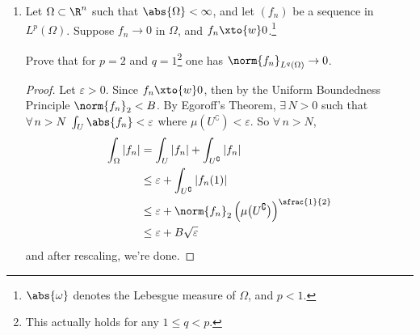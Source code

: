\documentclass[12pt,letterpaper]{article}
\renewcommand{\phi}{\varphi}
\renewcommand{\epsilon}{\varepsilon}
\begin{document}
\begin{enumerate}
\begin{example*}
\begin{remark*}
Wait, why doesn't it work that $\angles{\phi_n,u_j}\xto{j}\angles{\phi_n,u}\xto{n}\angles{\phi,u}$; using weak convergence followed by weak* convergence?

It does. However $\angles{\phi_k,u_k}\xto{k}\angles{\phi,u}$ requires that we can get $\angles{\phi_k,u_k}$ arbitrarily close to $\angles{\phi,u}$ without taking \textit{either one }of the limits.
\end{remark*}
\end{example*}
\begin{proof} \textsc{Case I:}
Suppose $\norm{x_n}\to\norm{x}$. Then there exists $N>0$ such that $n>N \implies \norm{x_n-x}<\epsilon$ for all $\epsilon>0$. Since $\phi_j\xto{w*}\phi$, then by the Uniform Boundedness Principle $\norm{\phi_j}\leq C$. Thus
\begin{align*}
\abs{(\phi_n-\phi)(x_n-x)}&\leq \phi_n(x_n-x) + \phi(x_n-x)\\
&\leq C\epsilon + C\epsilon
=2C\epsilon,
\end{align*}
and after rescaling, we're done. \qedwhite

\textsc{Case II:}
If on the other hand $\norm{\phi_n\to\phi}$, then $\hat{x}_n\xto{w**}\hat{x}$, and we can use the same proof as above. 
\end{proof}

\item Let $\Omega\subset\R^n$ such that $\abs{\Omega}<\infty$, and let $(f_n)$ be a sequence in $L^p(\Omega)$. Suppose $f_n\to 0$ \muae{} in $\Omega$, and $f_n\xto{w}0$.\footnote{$\abs{\omega}$ denotes the Lebesgue measure of $\Omega$, and $p < 1$.}

Prove that for $p=2$ and $q=1$\footnote{This actually holds for any $1\leq q <p$.} one has $\norm{f_n}_{L^q(\Omega)}\to0$.

\begin{proof}
Let $\epsilon>0$. Since $f_n\xto{w}0$, then by the Uniform Boundedness Principle $\norm{f_n}_2<B$. By Egoroff's Theorem, $\exists\, N>0$ such that $\forall\, n>N\; \int_U\abs{f_n}<\epsilon$ where $\mu(U^\complement)<\epsilon$. So $\forall\, n>N$, 
\begin{align*}
\int_\Omega |f_n|&=\int_U|f_n| + \int_{U^\complement}|f_n|\\
&\leq \epsilon + \int_{U^\complement}|f_n (1)|\\
&\leq \epsilon + \norm{f_n}_2\left(\mu\big(U^\complement\big)\right)^{\sfrac{1}{2}}\\
&\leq \epsilon + B\sqrt{\epsilon}
\end{align*}
and after rescaling, we're done. 
\end{proof}


\end{enumerate}
\end{document}
